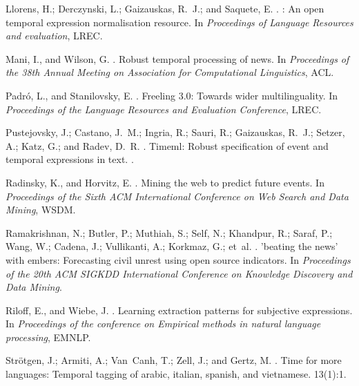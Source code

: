 \documentclass[letterpaper]{article}
\begin{document}
\begin{thebibliography}{}
Llorens, H.; Derczynski, L.; Gaizauskas, R.~J.; and Saquete, E.
.
: An open temporal expression normalisation resource.
\newblock In {\em Proceedings of Language Resources and evaluation}, LREC.

Mani, I., and Wilson, G.
.
\newblock Robust temporal processing of news.
\newblock In {\em Proceedings of the 38th Annual Meeting on Association for
  Computational Linguistics}, ACL.

Padró, L., and Stanilovsky, E.
.
\newblock Freeling 3.0: Towards wider multilinguality.
\newblock In {\em Proceedings of the Language Resources and Evaluation
  Conference}, LREC.

Pustejovsky, J.; Castano, J.~M.; Ingria, R.; Sauri, R.; Gaizauskas, R.~J.;
  Setzer, A.; Katz, G.; and Radev, D.~R.
.
\newblock Timeml: Robust specification of event and temporal expressions in
  text.
.

Radinsky, K., and Horvitz, E.
.
\newblock Mining the web to predict future events.
\newblock In {\em Proceedings of the Sixth ACM International Conference on Web
  Search and Data Mining}, WSDM.

Ramakrishnan, N.; Butler, P.; Muthiah, S.; Self, N.; Khandpur, R.; Saraf, P.;
  Wang, W.; Cadena, J.; Vullikanti, A.; Korkmaz, G.; et~al.
.
\newblock 'beating the news' with embers: Forecasting civil unrest using open
  source indicators.
\newblock In {\em Proceedings of the 20th ACM SIGKDD International Conference
  on Knowledge Discovery and Data Mining}.

Riloff, E., and Wiebe, J.
.
\newblock Learning extraction patterns for subjective expressions.
\newblock In {\em Proceedings of the conference on Empirical methods in natural
  language processing}, EMNLP.

Str{\"o}tgen, J.; Armiti, A.; Van~Canh, T.; Zell, J.; and Gertz, M.
.
\newblock Time for more languages: Temporal tagging of arabic, italian,
  spanish, and vietnamese.
 13(1):1.


\end{thebibliography}
\end{document}
